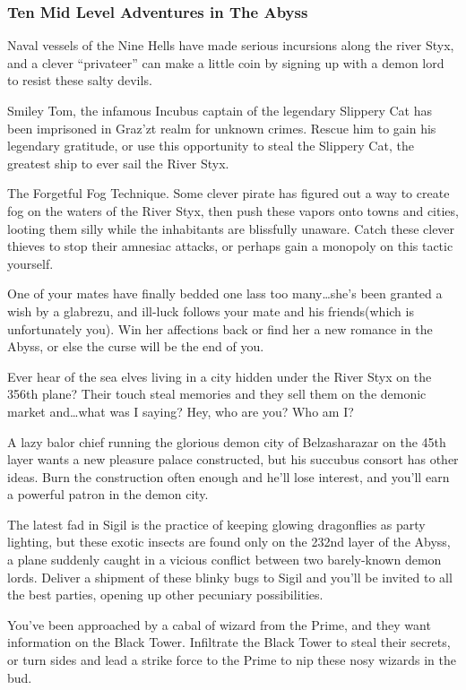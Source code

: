 \subsubsection{Ten Mid Level Adventures in The Abyss}

\listone
	\item Naval vessels of the Nine Hells have made serious incursions along the river Styx, and a clever ``privateer'' can make a little coin by signing up with a demon lord to resist these salty devils.
	\item Smiley Tom, the infamous Incubus captain of the legendary Slippery Cat has been imprisoned in Graz'zt realm for unknown crimes. Rescue him to gain his legendary gratitude, or use this opportunity to steal the Slippery Cat, the greatest ship to ever sail the River Styx.
	\item The Forgetful Fog Technique. Some clever pirate has figured out a way to create fog on the waters of the River Styx, then push these vapors onto towns and cities, looting them silly while the inhabitants are blissfully unaware. Catch these clever thieves to stop their amnesiac attacks, or perhaps gain a monopoly on this tactic yourself.
	\item One of your mates have finally bedded one lass too many\ldots she's been granted a wish by a glabrezu, and ill-luck follows your mate and his friends(which is unfortunately you). Win her affections back or find her a new romance in the Abyss, or else the curse will be the end of you.
	\item Ever hear of the sea elves living in a city hidden under the River Styx on the 356th plane? Their touch steal memories and they sell them on the demonic market and\ldots what was I saying? Hey, who are you? Who am I?
	\item A lazy balor chief running the glorious demon city of Belzasharazar on the 45th layer wants a new pleasure palace constructed, but his succubus consort has other ideas. Burn the construction often enough and he'll lose interest, and you'll earn a powerful patron in the demon city.
	\item The latest fad in Sigil is the practice of keeping glowing dragonflies as party lighting, but these exotic insects are found only on the 232nd layer of the Abyss, a plane suddenly caught in a vicious conflict between two barely-known demon lords. Deliver a shipment of these blinky bugs to Sigil and you'll be invited to all the best parties, opening up other pecuniary possibilities.
	\item You've been approached by a cabal of wizard from the Prime, and they want information on the Black Tower. Infiltrate the Black Tower to steal their secrets, or turn sides and lead a strike force to the Prime to nip these nosy wizards in the bud.
